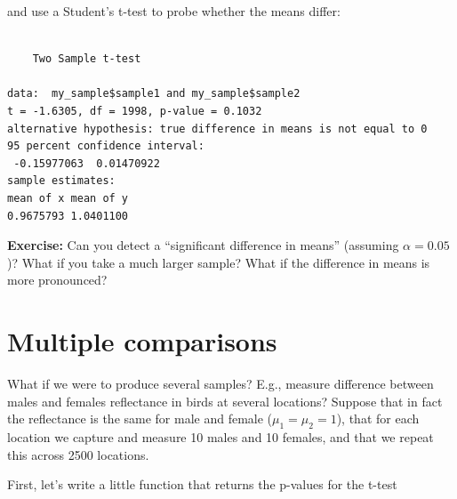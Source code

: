 \documentclass[
  letterpaper,
  DIV=11,
  numbers=noendperiod]{scrreprt}
\newenvironment{Shaded}{\begin{snugshade}}{\end{snugshade}}
\newcommand{\AttributeTok}[1]{\textcolor[rgb]{0.40,0.45,0.13}{#1}}
\newcommand{\CommentTok}[1]{\textcolor[rgb]{0.37,0.37,0.37}{#1}}
\newcommand{\ConstantTok}[1]{\textcolor[rgb]{0.56,0.35,0.01}{#1}}
\newcommand{\ControlFlowTok}[1]{\textcolor[rgb]{0.00,0.23,0.31}{#1}}
\newcommand{\FunctionTok}[1]{\textcolor[rgb]{0.28,0.35,0.67}{#1}}
\newcommand{\NormalTok}[1]{\textcolor[rgb]{0.00,0.23,0.31}{#1}}
\newcommand{\OtherTok}[1]{\textcolor[rgb]{0.00,0.23,0.31}{#1}}
\newcommand{\SpecialCharTok}[1]{\textcolor[rgb]{0.37,0.37,0.37}{#1}}
\begin{document}
and use a Student's t-test to probe whether the means differ:

\begin{Shaded}
\end{Shaded}

\begin{verbatim}

    Two Sample t-test

data:  my_sample$sample1 and my_sample$sample2
t = -1.6305, df = 1998, p-value = 0.1032
alternative hypothesis: true difference in means is not equal to 0
95 percent confidence interval:
 -0.15977063  0.01470922
sample estimates:
mean of x mean of y 
0.9675793 1.0401100 
\end{verbatim}

\textbf{Exercise:} Can you detect a ``significant difference in means''
(assuming \(\alpha = 0.05\))? What if you take a much larger sample?
What if the difference in means is more pronounced?

\hypertarget{multiple-comparisons}{%
\section{Multiple comparisons}\label{multiple-comparisons}}

What if we were to produce several samples? E.g., measure difference
between males and females reflectance in birds at several locations?
Suppose that in fact the reflectance is the same for male and female
(\(\mu_1 = \mu_2 = 1\)), that for each location we capture and measure
10 males and 10 females, and that we repeat this across 2500 locations.

First, let's write a little function that returns the p-values for the
t-test

\begin{Shaded}
\end{Shaded}
\end{document}
